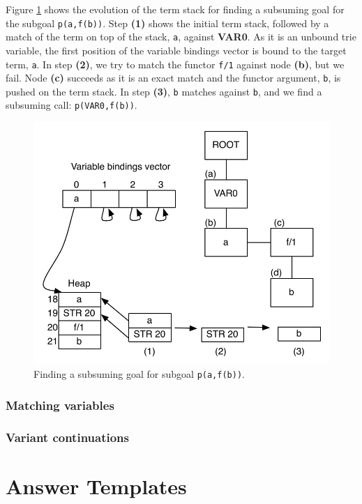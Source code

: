 Figure \ref{fig:match_functor} shows the evolution of the term stack for finding
a subsuming goal for the subgoal \texttt{p(a,f(b))}. Step \textbf{(1)} shows the initial 
term stack, followed by a match of the term on top of the stack, \texttt{a}, against \textbf{VAR0}.
As it is an unbound trie variable, the first position of the variable bindings vector is
bound to the target term, \texttt{a}.
In step \textbf{(2)}, we try to match the functor \texttt{f/1} against node \textbf{(b)}, but we fail.
Node \textbf{(c)} succeeds as it is an exact match and the functor argument, \texttt{b}, is pushed on
the term stack. In step \textbf{(3)}, \texttt{b} matches against \texttt{b}, and we find a subsuming call:
\texttt{p(VAR0,f(b))}.

\begin{figure}[ht]
  \centering
    \includegraphics[scale=0.6]{match_functor.pdf}
  \caption{Finding a subsuming goal for subgoal \texttt{p(a,f(b))}.}
  \label{fig:match_functor}
\end{figure}

\subsubsection{Matching variables}

\subsubsection{Variant continuations}

\section{Answer Templates}

